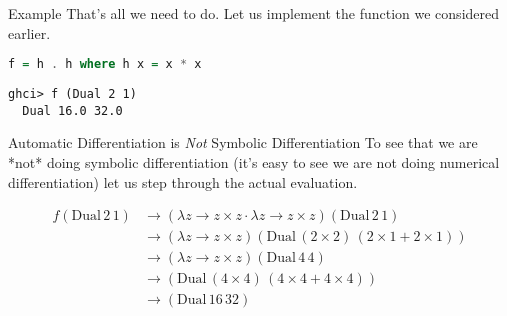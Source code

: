 \documentclass{beamer}
\begin{document}
\begin{frame}[fragile]{Example}
That's all we need to do. Let us implement the function we considered
earlier.

\begin{scriptsize}
\begin{lstlisting}[language=Haskell]
f = h . h where h x = x * x
\end{lstlisting}
\end{scriptsize}

\begin{scriptsize}
\begin{lstlisting}
ghci> f (Dual 2 1)
  Dual 16.0 32.0
\end{lstlisting}
\end{scriptsize}
\end{frame}

\begin{frame}[fragile]{Automatic Differentiation is {\em Not} Symbolic
    Differentiation}
To see that we are *not* doing symbolic differentiation (it's easy to
see we are not doing numerical differentiation) let us step
through the actual evaluation.

$$
\begin{aligned}
f (\mathrm{Dual}\,2\,1) &\longrightarrow (\lambda z \rightarrow z
\times z \cdot \lambda z \rightarrow z \times z) (\mathrm{Dual}\,2\,1) \\
&\longrightarrow (\lambda z \rightarrow z
\times z) (\mathrm{Dual}\,(2 \times 2)\,(2 \times 1 + 2 \times 1)) \\
&\longrightarrow  (\lambda z \rightarrow z
\times z) (\mathrm{Dual}\,4\,4)\\
&\longrightarrow (\mathrm{Dual}\,(4 \times 4)\,(4 \times 4 + 4 \times 4)) \\
&\longrightarrow (\mathrm{Dual}\,16\,32)\\
\end{aligned}
$$
\end{frame}
\end{document}
